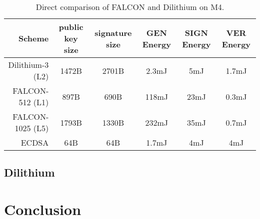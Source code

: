 \documentclass[conference]{IEEEtran}
\newcommand{\comment}[1]{}
\begin{document}
\begin{table*}[]
    \caption{Direct comparison of FALCON and Dilithium on M4. \cite{Energy_comp}}
    \label{t:falconVSdil}
    \centering\begin{tabular}{ | r | c c c c c |}
        \hline
        Scheme & public key size & signature size & GEN Energy & SIGN Energy & VER Energy \\
        \hline
        Dilithium-3 (L2)    & 1472B & 2701B & 2.3mJ & 5mJ   & 1.7mJ \\
        FALCON-512 (L1)     & 897B  & 690B  & 118mJ & 23mJ  & 0.3mJ \\
        FALCON-1025 (L5)    & 1793B & 1330B & 232mJ & 35mJ  & 0.7mJ \\
        \hline
        ECDSA               & 64B   & 64B   & 1.7mJ & 4mJ   & 4mJ \\
        \hline
    \end{tabular}
\end{table*}

\subsection{Dilithium}


\section{Conclusion}
\comment{ %
- of course no protection against side channel etc 
- quantum fast evolving, active field of research
- smart home, smart campus, smart city
- quantum key distribution
\cite{QR_comparison}
} %



\end{document}
